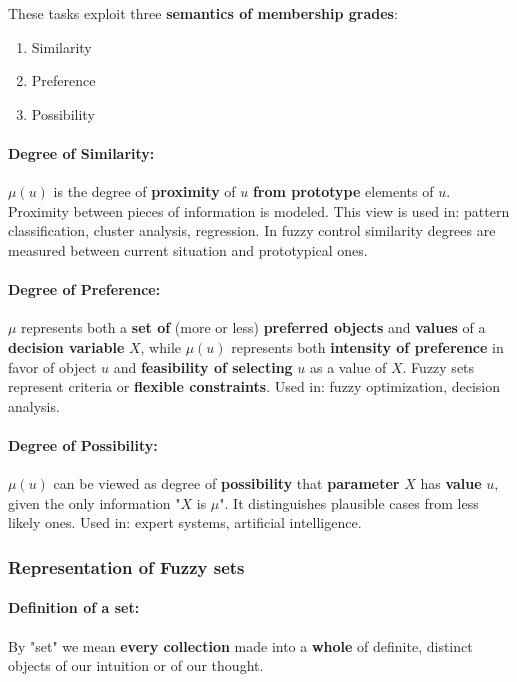 \documentclass[11pt]{article}
\begin{document}
		These tasks exploit three \textbf{semantics of membership grades}: 
		\begin{enumerate}
			\item Similarity 
			\item Preference 
			\item Possibility
		\end{enumerate}
		
		\paragraph{Degree of Similarity:} $\mu(u)$ is the degree of \textbf{proximity} of $u$ \textbf{from prototype} elements of $u$. Proximity between pieces of information is modeled. This view is used in: pattern classification, cluster analysis, regression. In fuzzy control similarity degrees are measured between current situation and prototypical ones.\\
		
		\paragraph{Degree of Preference:} $\mu$ represents both a \textbf{set of} (more or less) \textbf{preferred objects} and \textbf{values} of a \textbf{decision variable} $X$, while $\mu (u)$ represents both \textbf{intensity of preference} in favor of object $u$ and \textbf{feasibility of selecting} $u$ as a value of $X$. Fuzzy sets represent criteria or \textbf{flexible constraints}. Used in: fuzzy optimization, decision analysis.\\
		
		\paragraph{Degree of Possibility:} $\mu (u)$ can be viewed as degree of \textbf{possibility} that \textbf{parameter} $X$ has \textbf{value} $u$, given the only information "$X$ is $\mu$". It distinguishes plausible cases from less likely ones. Used in: expert systems, artificial intelligence.\\
		
		\newpage
		
		\subsubsection{Representation of Fuzzy sets}
		
		\paragraph{Definition of a set:} By "set" we mean \textbf{every collection} made into a \textbf{whole} of definite, distinct objects of our intuition or of our thought.\\
		
\end{document}
